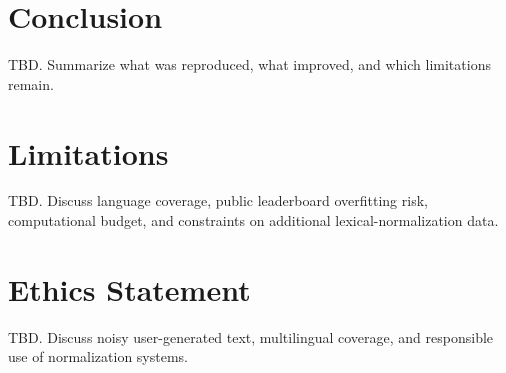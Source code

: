 \documentclass[11pt]{article}
\begin{document}
\section{Conclusion}

TBD. Summarize what was reproduced, what improved, and which limitations remain.

\section*{Limitations}

TBD. Discuss language coverage, public leaderboard overfitting risk, computational budget, and constraints on additional lexical-normalization data.

\section*{Ethics Statement}

TBD. Discuss noisy user-generated text, multilingual coverage, and responsible use of normalization systems.


\end{document}
